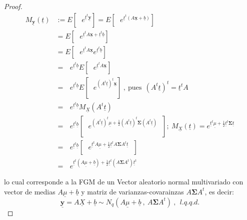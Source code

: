 \documentclass[
]{book}
\theoremstyle{definition}
\theoremstyle{definition}
\theoremstyle{definition}
\theoremstyle{definition}
\theoremstyle{remark}
\begin{document}
\begin{proof}
\begin{align*}
M_{\underline{\mathbf{y}}}(\underline{t})&:=E\left[{\text{ $e^{\underline{t}^t\underline{\mathbf{y}}}$}}\right]=E\left[{\text{ $e^{\underline{t}^t(A\underline{\mathbf{x}}+\underline{b})}$}}\right]\\
&=E\left[{\text{ $e^{\underline{t}^tA\underline{\mathbf{x}}+\underline{t}^t \underline{b}}$}}\right]\\
&=E\left[{\text{ $e^{\underline{t}^tA\underline{\mathbf{x}}} e^{\underline{t}^t \underline{b}}$}}\right]\\
&=\text{ $e^{\underline{t}^t \underline{b}}$}  E\left[{\text{ $e^{\underline{t}^tA\underline{\mathbf{x}}}$}}\right]\\
&=\text{ $e^{\underline{t}^t \underline{b}}$}  E\left[{\text{ $e^{(A^t\underline{t})^t\underline{\mathbf{x}}}$}}\right]\ , \ \text{pues} \ \ (A^t\underline{t})^t=\underline{t}^tA \\
&=\text{ $e^{\underline{t}^t \underline{b}}$}  M_{\underline{X}}(A^t\underline{t})\\
&=\text{ $e^{\underline{t}^t \underline{b}}$}  \left[ \text{ $e^{ (A^t\underline{t})^t \underline{\mu} + \frac{1}{2} (A^t\underline{t})^t \mathbf{\Sigma} (A^t\underline{t})  }$  } \right]
;\ M_{\underline{X}}(\underline{t})=e^{\underline{t}^t\underline{\mu} +\frac{1}{2}\underline{t}^t\mathbf{\Sigma}\underline{t}}\\ 
&= \text{ $e^{\underline{t}^t \underline{b}}$}  \left[ \text{ $e^{ \underline{t}^tA \underline{\mu} + \frac{1}{2} \underline{t}^t A \mathbf{\Sigma} A^t\underline{t}  }$  } \right]\\
&= \text{ $e^{\underline{t}^t  \left( A \underline{\mu} + \underline{b} \right) + \frac{1}{2} \underline{t}^t  \left(A\mathbf{\Sigma} A^t   \right) \underline{t}^t }$} 
\end{align*}

lo cual corresponde a la FGM de un Vector aleatorio normal multivariado con vector de medias \(A \underline{\mu} + \underline{b}\) y matriz de varianzas-covarainzas \(A\mathbf{\Sigma} A^t\), es decir:
\[
\underline{\mathbf{y}}=A \underline{X}+ \underline{b} \sim N_q(A \underline{\mu}+\underline{b}\ , \ A\mathbf{\Sigma} A^t )\ , \ \ l.q.q.d.
\]
\end{proof}
\end{document}
